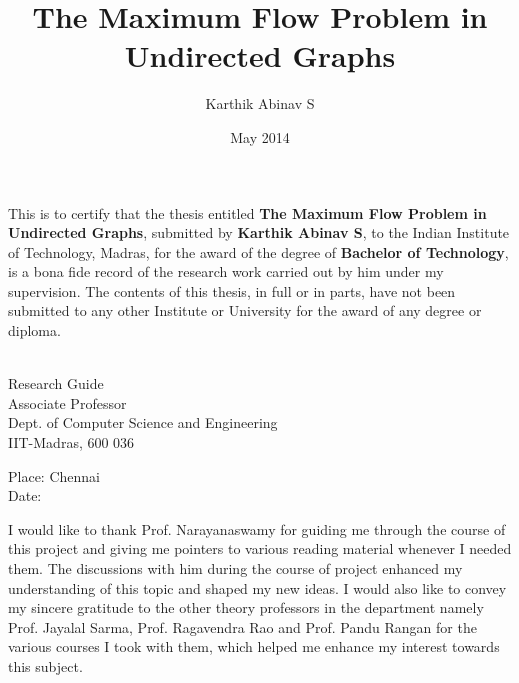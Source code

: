 \documentclass[BTech]{iitmdiss}
\def\thesistitle{The Maximum Flow Problem in Undirected Graphs}
\def\thesisauthor{Karthik Abinav S}
\begin{document}


\title{\thesistitle}

\author{\thesisauthor}

\date{May 2014}

\begin{singlespace}
\maketitle 
\end{singlespace} 


\newtheorem{thm}{Theorem}
\newtheorem{lemma}{Lemma}
\newtheorem{prop}{Proposition}
\newtheorem{modif}{Modification}
\newtheorem{defn}{Definition}

\certificate

\vspace*{0.5in}

\noindent This is to certify that the thesis entitled {\bf {\thesistitle}}, 
submitted by {\bf {\thesisauthor}}, to the Indian Institute of Technology, 
Madras, for the award of the degree of {\bf Bachelor of Technology}, 
is a bona fide record of the research work carried out by him under my
supervision. The contents of this thesis, in full or in parts, have not been
submitted to any other Institute or University for the award of any degree or
diploma.

\vspace*{1.4in}
\hspace*{-0.25in}
\begin{singlespace}
 \\
\noindent Research Guide \\ 
\noindent Associate Professor \\
\noindent Dept. of Computer Science and Engineering\\
\noindent IIT-Madras, 600 036 \\
\end{singlespace}
\vspace*{0.20in}
\noindent Place: Chennai\\ 
Date:

\acknowledgements

  I would like to thank Prof. Narayanaswamy for guiding me through the course of this project and giving me pointers to various reading material
  whenever I needed them. The discussions with him during the course of project enhanced my understanding of this topic and shaped my new ideas.
  I would also like to convey my sincere gratitude to the other theory professors in the department namely Prof. Jayalal Sarma, Prof. Ragavendra Rao and
  Prof. Pandu Rangan for the various courses I took with them, which helped me enhance my interest towards this subject. \\
  
\end{document}
